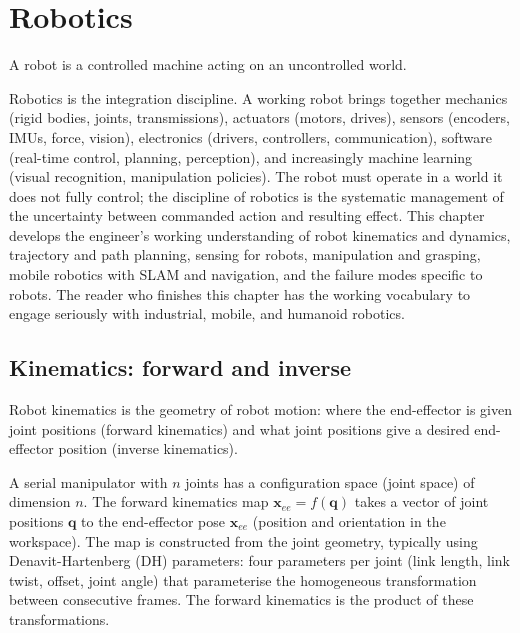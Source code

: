 \chapter{Robotics}
\label{vol08:ch13}

\epigraph{A robot is a controlled machine acting on an uncontrolled world.}{}


\noindent
Robotics is the integration discipline. A working robot brings together mechanics (rigid bodies, joints, transmissions), actuators (motors, drives), sensors (encoders, IMUs, force, vision), electronics (drivers, controllers, communication), software (real-time control, planning, perception), and increasingly machine learning (visual recognition, manipulation policies). The robot must operate in a world it does not fully control; the discipline of robotics is the systematic management of the uncertainty between commanded action and resulting effect. This chapter develops the engineer's working understanding of robot kinematics and dynamics, trajectory and path planning, sensing for robots, manipulation and grasping, mobile robotics with SLAM and navigation, and the failure modes specific to robots. The reader who finishes this chapter has the working vocabulary to engage seriously with industrial, mobile, and humanoid robotics.

\section{Kinematics: forward and inverse}

Robot kinematics is the geometry of robot motion: where the end-effector is given joint positions (forward kinematics) and what joint positions give a desired end-effector position (inverse kinematics).

A serial manipulator with $n$ joints has a configuration space (joint space) of dimension $n$. The forward kinematics map $\mathbf{x}_{ee} = f(\mathbf{q})$ takes a vector of joint positions $\mathbf{q}$ to the end-effector pose $\mathbf{x}_{ee}$ (position and orientation in the workspace). The map is constructed from the joint geometry, typically using Denavit-Hartenberg (DH) parameters: four parameters per joint (link length, link twist, offset, joint angle) that parameterise the homogeneous transformation between consecutive frames. The forward kinematics is the product of these transformations.

